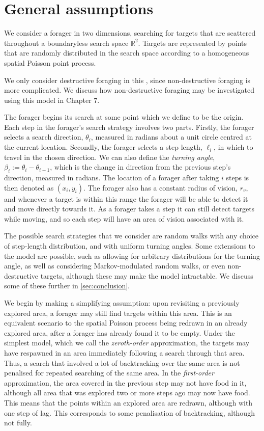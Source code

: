 \section{General assumptions}

We consider a forager in two dimensions, searching for targets that are scattered throughout a boundaryless search space $\mathbb{R}^2$.
Targets are represented by points that are randomly distributed in the search space according to a homogeneous spatial Poisson point process.

We only consider destructive foraging in this , since non-destructive foraging is more complicated.
We discuss how non-destructive foraging may be investigated using this model in Chapter 7.

The forager begins its search at some point which we define to be the origin.
Each step in the forager's search strategy involves two parts.
Firstly, the forager selects a search direction, $\theta_i$, measured in radians about a unit circle centred at the current location.
Secondly, the forager selects a step length, $\ell_i$, in which to travel in the chosen direction. We can also define the \emph{turning angle}, $\beta_i:=\theta_i-\theta_{i-1}$, which is the change in direction from the previous step's direction, measured in radians.
The location of a forager after taking $i$ steps is then denoted as $(x_i,y_i)$.
The forager also has a constant radius of vision, $r_v$, and whenever a target is within this range the forager will be able to detect it and move directly towards it.
As a forager takes a step it can still detect targets while moving, and so each step will have an area of vision associated with it.

The possible search strategies that we consider are random walks with any choice of step-length distribution, and with uniform turning angles. 
Some extensions to the model are possible, such as allowing for arbitrary distributions for the turning angle, as well as considering Markov-modulated random walks, or even non-destructive targets,   although these may make the model intractable. 
We discuss some of these further in \cref{sec:conclusion}.

We begin by making a simplifying assumption: upon revisiting a previously explored area, a forager may still find targets within this area.
This is an equivalent scenario to the spatial Poisson process being redrawn in an already explored area, after a forager has already found it to be empty.
Under the simplest model, which we call the \emph{zeroth-order} approximation, the targets may have respawned in an area immediately following a search through that area.
Thus, a search that involved a lot of backtracking over the same area is not penalised for repeated searching of the same area.
In the \emph{first-order} approximation, the area covered in the previous step may not have food in it, although all area that was explored two or more steps ago may now have food. 
This means that the points within an explored area are redrawn, although with one step of lag.
This corresponds to some penalisation of backtracking, although not fully.

